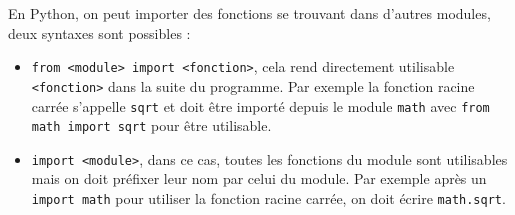 \documentclass[11pt,a4paper]{article}
\begin{document}
\begin{tcolorbox}[left=0cm,title=\bf{\faPython \; Importation de fonctions},colbacktitle=cfond]
    En Python, on peut importer des fonctions se trouvant dans d'autres modules, deux syntaxes sont possibles :
    \begin{itemize}
        \item[\textbullet] {\tt from <module> import <fonction>}, cela rend directement utilisable {\tt <fonction>} dans la suite du programme. Par exemple la fonction racine carrée s'appelle \texttt{sqrt} et doit être importé depuis le module \texttt{math} avec \texttt{from math import sqrt} pour être utilisable.
        \item[\textbullet] {\tt import <module>}, dans ce cas, toutes les fonctions du module sont utilisables mais on doit préfixer leur nom par celui du module. Par exemple après un \texttt{import math} pour utiliser la fonction racine carrée, on doit écrire \texttt{math.sqrt}.
    \end{itemize}
\end{tcolorbox}
\end{document}
